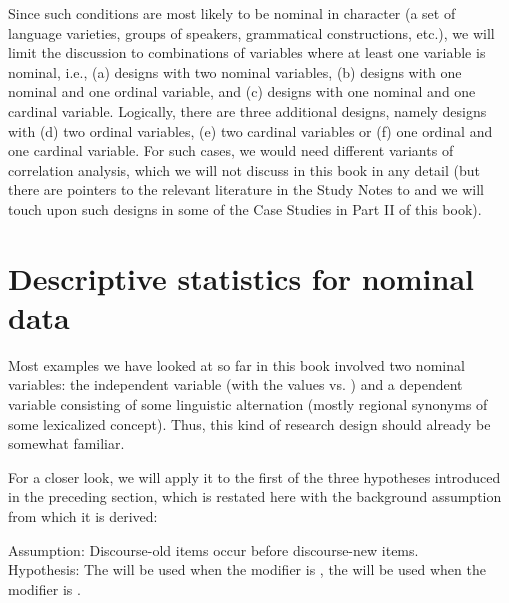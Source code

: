 Since such conditions are most likely to be nominal  in character (a set of language varieties,  groups of speakers, grammatical constructions, etc.), we will limit the discussion to combinations of variables where at least one variable is nominal, i.e., (a) designs  with two nominal variables, (b) designs with one nominal and one ordinal  variable, and (c) designs with one nominal and one cardinal  variable. Logically, there are three additional designs, namely designs with (d) two ordinal variables, (e) two cardinal  variables or (f) one ordinal  and one cardinal  variable. For such cases, we would need different variants of correlation  analysis, which we will not discuss in this book in any detail (but there are pointers to the relevant literature in the Study Notes to  and we will touch upon such designs  in some of the Case Studies in Part II of this book).

\section{Descriptive statistics for nominal data}
\label{sec:descriptivenominal}

Most examples we have looked at so far in this book involved two nominal  variables: the independent variable   (with the values  vs. ) and a dependent variable consisting of some linguistic alternation  (mostly regional synonyms  of some lexicalized  concept). Thus, this kind of research design  should already be somewhat familiar.

For a closer look, we will apply it to the first of the three hypotheses  introduced in the preceding section, which is restated here with the background assumption from which it is derived:

\begin{exe}
\ex Assumption: Discourse\hyp{}old items occur before discourse\hyp{}new items. \\
Hypothesis:  The   will be used when the modifier is , the  will be used when the modifier is .
\label{ex:givennesshypothesis}
\end{exe}

